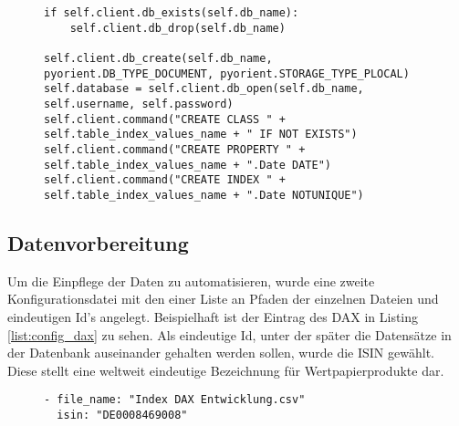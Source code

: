 \begin{figure}[!htb]
    \begin{lstlisting}[caption=Anlegen und initialiseren einer Datenbank in Python, label=list:create_db]
if self.client.db_exists(self.db_name):
    self.client.db_drop(self.db_name)

self.client.db_create(self.db_name, pyorient.DB_TYPE_DOCUMENT, pyorient.STORAGE_TYPE_PLOCAL)
self.database = self.client.db_open(self.db_name, self.username, self.password)
self.client.command("CREATE CLASS " + self.table_index_values_name + " IF NOT EXISTS")
self.client.command("CREATE PROPERTY " + self.table_index_values_name + ".Date DATE")
self.client.command("CREATE INDEX " + self.table_index_values_name + ".Date NOTUNIQUE")
    \end{lstlisting}
\end{figure}

\subsection{Datenvorbereitung}
\label{sec:datenvorbereitung}

Um die Einpflege der Daten zu automatisieren, wurde eine zweite Konfigurationsdatei mit den einer Liste an Pfaden der einzelnen Dateien und eindeutigen Id's angelegt. Beispielhaft ist der Eintrag des DAX in Listing \ref{list:config_dax} zu sehen. Als eindeutige Id, unter der später die Datensätze in der Datenbank auseinander gehalten werden sollen, wurde die \gls{ISIN} gewählt. Diese stellt eine weltweit eindeutige Bezeichnung für Wertpapierprodukte dar.

\begin{figure}[!htb]
    \begin{lstlisting}[caption=Konfigeintrag des DAX, label=list:config_dax]
- file_name: "Index DAX Entwicklung.csv"
  isin: "DE0008469008"
    \end{lstlisting}
\end{figure}

